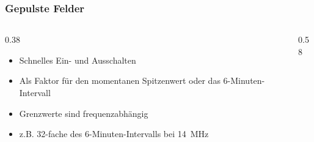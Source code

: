 \begin{frame}
    \frametitle{Gepulste Felder}
    \begin{columns}
        \begin{column}{0.38\linewidth}
            \begin{itemize}
                \item Schnelles Ein- und Ausschalten
                \item Als Faktor für den momentanen Spitzenwert oder das 6-Minuten-Intervall
                \item Grenzwerte sind frequenzabhängig
                \item z.B. 32-fache des 6-Minuten-Intervalls bei \qty{14}{\mega\hertz}
            \end{itemize}
        \end{column}
        \begin{column}{0.58\linewidth}
        \end{column}
    \end{columns}
\end{frame}

